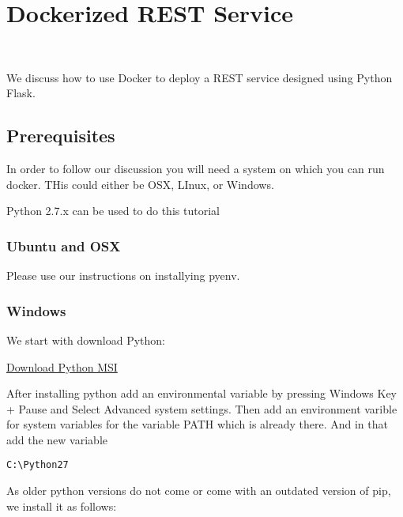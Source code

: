 
\section{Dockerized REST Service}
\label{s:docker-flask-rest} 
\FILENAME\

We discuss how to use Docker to deploy a REST service designed using
Python Flask.

\subsection{Prerequisites}

In order to follow our discussion you will need a system on which you
can run docker. THis could either be OSX, LInux, or Windows.

\begin{NOTE}
  Python 2.7.x can be used to do this tutorial
\end{NOTE}


\subsubsection{Ubuntu and OSX}

Please use our instructions on installying pyenv.

\subsubsection{Windows}

We start with download Python:

\href{https://www.python.org/ftp/python/2.7.14/python-2.7.14.msi}{Download
Python MSI}

After installing python add an environmental variable by pressing
Windows Key + Pause and Select Advanced system settings. Then add an
environment varible for system variables for the variable PATH which is
already there. And in that add the new variable

\begin{lstlisting}
C:\Python27
\end{lstlisting}

As older python versions do not come or come with an outdated version of
pip, we install it as follows:

